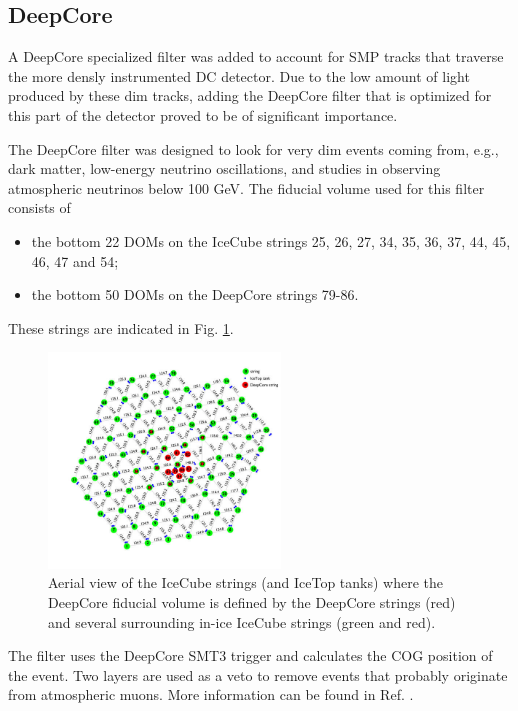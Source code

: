 \subsection{DeepCore}
A DeepCore specialized filter was added to account for SMP tracks that traverse the more densly instrumented DC detector. Due to the low amount of light produced by these dim tracks, adding the DeepCore filter that is optimized for this part of the detector proved to be of significant importance.

The DeepCore filter was designed to look for very dim events coming from, e.g., dark matter, low-energy neutrino oscillations, and studies in observing atmospheric neutrinos below 100 GeV. The fiducial volume used for this filter consists of
\vspace{2mm}
\begin{itemize}
\item the bottom 22 DOMs on the IceCube strings 25, 26, 27, 34, 35, 36, 37, 44, 45, 46, 47 and 54;
\item the bottom 50 DOMs on the DeepCore strings 79-86.
\end{itemize}
\vspace{2mm}
These strings are indicated in Fig. \ref{fig:deepcorestrings}.\\

\begin{figure}[t]
\centering
\includegraphics[width=0.55\textwidth]{chapter8/img/stringview.jpg}
\caption{Aerial view of the IceCube strings (and IceTop tanks) where the DeepCore fiducial volume is defined by the DeepCore strings (red) and several surrounding in-ice IceCube strings (green and red).}
\label{fig:deepcorestrings}
\end{figure}

\noindent The filter uses the DeepCore SMT3 trigger and calculates the COG position of the event. Two layers are used as a veto to remove events that probably originate from atmospheric muons. More information can be found in Ref. \cite{DeepCore2012}.

